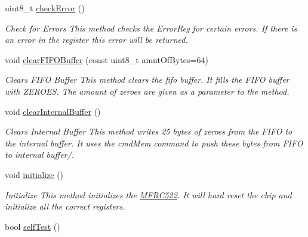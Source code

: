 \begin{DoxyCompactItemize}
\mbox{\label{classMFRC522_aa45277248a32ce30e7ded5fd305f2a15}} 
uint8\+\_\+t \hyperlink{classMFRC522_aa45277248a32ce30e7ded5fd305f2a15}{check\+Error} ()
\begin{DoxyCompactList}\small\item\em Check for Errors  This method checks the Error\+Reg for certain errors. If there is an error in the register this error will be returned. \end{DoxyCompactList}\item 
\mbox{\label{classMFRC522_a0a4fb373d6adcfa08c2f274be1a3c0e5}} 
void \hyperlink{classMFRC522_a0a4fb373d6adcfa08c2f274be1a3c0e5}{clear\+F\+I\+F\+O\+Buffer} (const uint8\+\_\+t amnt\+Of\+Bytes=64)
\begin{DoxyCompactList}\small\item\em Clears F\+I\+FO Buffer  This method clears the fifo buffer. It fills the F\+I\+FO buffer with Z\+E\+R\+O\+ES. The amount of zeroes are given as a parameter to the method. \end{DoxyCompactList}\item 
\mbox{\label{classMFRC522_a9d2c5ad7b977944e8bcbbcc9c1bb9b75}} 
void \hyperlink{classMFRC522_a9d2c5ad7b977944e8bcbbcc9c1bb9b75}{clear\+Internal\+Buffer} ()
\begin{DoxyCompactList}\small\item\em Clears Internal Buffer  This method writes 25 bytes of zeroes from the F\+I\+FO to the internal buffer. It uses the cmd\+Mem command to push these bytes from F\+I\+FO to internal buffer/. \end{DoxyCompactList}\item 
\mbox{\label{classMFRC522_a09f08823fbb8368bf5a597f210d629c1}} 
void \hyperlink{classMFRC522_a09f08823fbb8368bf5a597f210d629c1}{initialize} ()
\begin{DoxyCompactList}\small\item\em Initialize  This method initialize\textquotesingle{}s the \hyperlink{classMFRC522}{M\+F\+R\+C522}. It will hard reset the chip and initialize all the correct registers. \end{DoxyCompactList}\item 
\mbox{\label{classMFRC522_a682e7232aee2470878fda4790cbceddd}} 
bool \hyperlink{classMFRC522_a682e7232aee2470878fda4790cbceddd}{self\+Test} ()

\end{DoxyCompactItemize}
